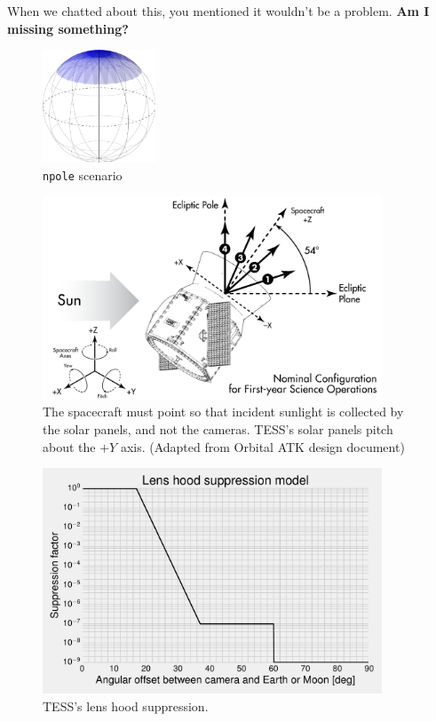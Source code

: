 \documentclass{article}
\begin{document}
	When we chatted about this, you mentioned it wouldn't be a problem. 
	{\bf Am I missing something?}
	
	
	
	\begin{figure}[!h]
		\centering
		\includegraphics[width=0.3\textwidth]{../figures/npole.pdf}
		\caption{\texttt{npole} scenario}
		\label{fig:npole}
	\end{figure}
	
	\begin{figure}[!b]
		\centering
		\includegraphics[width=0.9\textwidth]{../figures/spacecraft_angles.pdf}
		\caption{The spacecraft must point so that incident sunlight is collected 
			by the solar panels, and not the cameras. TESS's solar panels pitch 
			about the $+Y$ axis. (Adapted from Orbital ATK design document) }
		\label{fig:spacecraft_angles}
	\end{figure}

	\begin{figure}[!b]
		\centering
		\includegraphics[width=0.9\textwidth]{../figures/lens_hood_suppression.pdf}
		\caption{TESS's lens hood suppression. }
		\label{fig:lens_hood_suppression}
	\end{figure}
\end{document}
